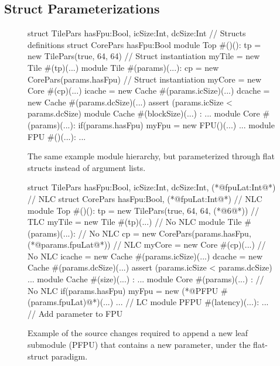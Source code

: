 \subsection{Struct Parameterizations}

\begin{figure}
\centering
\begin{phdl}
struct TilePars {hasFpu:Bool, icSize:Int, dcSize:Int} // Structs definitions
struct CorePars {hasFpu:Bool}
module Top #()():
  tp = new TilePars(true, 64, 64)                     // Struct instantiation
  myTile = new Tile #(tp)(...)
module Tile #(params)(...):
  cp = new CorePars(params.hasFpu)                    // Struct instantiation
  myCore = new Core  #(cp)(...)
  icache = new Cache #(params.icSize)(...)
  dcache = new Cache #(params.dcSize)(...)
  assert (params.icSize < params.dcSize)
module Cache #(blockSize)(...) : ...
module Core #(params)(...):
  if(params.hasFpu) myFpu = new FPU()(...) ...
module FPU #()(...): ...
\end{phdl} 
\caption{The same example module hierarchy, but parameterized through flat structs instead of argument lists.}
\label{fig:flatstruct}
\end{figure}

\begin{figure}
\centering
\begin{phdl}
struct TilePars {hasFpu:Bool, icSize:Int, dcSize:Int, (*@\textcolor[rgb]{1,0,0}{fpuLat:Int}@*)} // NLC
struct CorePars {hasFpu:Bool, (*@\textcolor[rgb]{1,0,0}{fpuLat:Int}@*)}                         // NLC
module Top #()():
  tp = new TilePars(true, 64, 64, (*@\textcolor[rgb]{1,0,0}{6}@*))                              // TLC
  myTile = new Tile #(tp)(...)                                    // No NLC
module Tile #(params)(...):                                       // No NLC
  cp = new CorePars(params.hasFpu, (*@\textcolor[rgb]{1,0,0}{params.fpuLat}@*))                 // NLC
  myCore = new Core  #(cp)(...)                                   // No NLC
  icache = new Cache #(params.icSize)(...)
  dcache = new Cache #(params.dcSize)(...)
  assert (params.icSize < params.dcSize) ...
module Cache #(size)(...) : ...
module Core #(params)(...) :                                     // No NLC
  if(params.hasFpu) myFpu = new (*@\textcolor[rgb]{1,0,0}{PFPU \#(params.fpuLat)}@*)(...) ...   // LC
module PFPU #(latency)(...): ...     // Add parameter to FPU 
\end{phdl} 
\caption{Example of the source changes required to append a new leaf submodule (PFPU) that contains a new parameter,
under the flat-struct paradigm.}
\label{fig:flatstruct-delta}
\end{figure}

